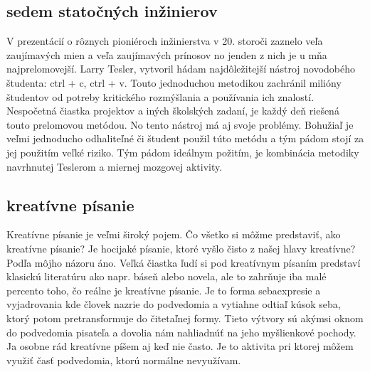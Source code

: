 \documentclass[10pt,twoside,slovak,a4paper]{article}
\begin{document}
\subsection{sedem statočných inžinierov}
V prezentácií o rôznych pioniéroch inžinierstva v 20. storoči zaznelo veľa zaujímavých mien a veľa zaujímavých prínosov no jenden z nich je u mňa najprelomovejší. Larry Tesler, vytvoril hádam najdôležitejší nástroj novodobého študenta: ctrl + c, ctrl + v. Touto jednoduchou metodikou zachránil milióny študentov od potreby kritického rozmýšlania a používania ich znalostí. Nespočetná čiastka projektov a iných školských zadaní, je každý deň riešená touto prelomovou metódou. No tento nástroj má aj svoje problémy. Bohužiaľ je veľmi jednoducho odhaliteľné či študent použil túto metódu a tým pádom stojí za jej použitím veľké riziko. Tým pádom ideálnym požitím, je kombinácia metodiky navrhnutej Teslerom a miernej mozgovej aktivity.

\subsection{kreatívne písanie}
Kreatívne písanie je veľmi široký pojem. Čo všetko si môžme predstaviť, ako kreatívne písanie? Je hocijaké písanie, ktoré vyšlo čisto z našej hlavy kreatívne? Podľa môjho názoru áno. Veľká čiastka ľudí si pod kreatívnym písaním predstaví klasickú literatúru ako napr. báseň alebo novela, ale to zahrňuje iba malé percento toho, čo reálne je kreatívne písanie. Je to forma sebaexpresie a vyjadrovania kde človek nazrie do podvedomia a vytiahne odtiaľ kúsok seba, ktorý potom pretransformuje do čitetaľnej formy. Tieto výtvory sú akýmsi oknom do podvedomia pisateľa a dovolia nám nahliadnúť na jeho myšlienkové pochody. Ja osobne rád kreatívne píšem aj keď nie často. Je to aktivita pri ktorej môžem využiť časť podvedomia, ktorú normálne nevyužívam.
\end{document}
